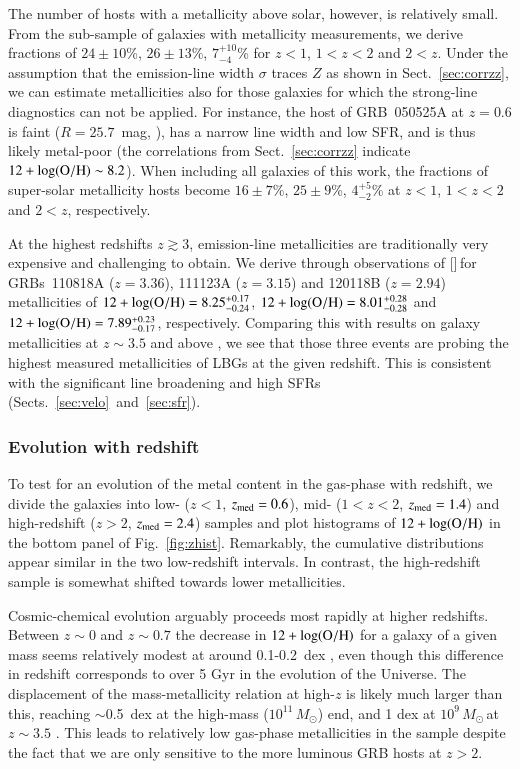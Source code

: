 \documentclass[traditabstract, longauth]{aa}
\newcommand{\oh}{12+\log(\rm{O/H})}
\newcommand{\neiii}{[\ion{Ne}{iii}]}
\newcommand{\Msun}{$M_\odot$}
\begin{document}
{The number of hosts with a metallicity above solar, however, is relatively small. From the sub-sample of galaxies with metallicity measurements, we derive fractions of $24\pm 10$\%, $26\pm 13$\%, $7_{-4}^{+10}$\% for $z<1$, $1<z<2$ and $2<z$.  
Under the assumption that the emission-line width $\sigma$ traces $Z$ as shown in Sect.~\ref{sec:corrzz}, we can estimate metallicities also for those galaxies for which the strong-line diagnostics can not be applied. For instance, the host of GRB~050525A at $z=0.6$ is faint ($R=25.7$~mag, \citealp{2012ApJ...756..187H}), has a narrow line width and low SFR, and is thus likely metal-poor (the correlations from Sect.~\ref{sec:corrzz} indicate $\oh\sim8.2$). When including all galaxies of this work, the fractions of super-solar metallicity hosts become $16\pm7$\%, $25\pm9$\%, $4_{-2}^{+5}$\% at $z<1$, $1<z<2$ and $2<z$, respectively.}

At the highest redshifts $z\gtrsim3$, emission-line metallicities are traditionally very expensive and challenging to obtain. We derive through observations of \neiii\,for GRBs~110818A ($z=3.36$), 111123A ($z=3.15$) and 120118B ($z=2.94$) metallicities of $\oh=8.25_{-0.24}^{+0.17}$, $\oh=8.01_{-0.28}^{+0.28}$ and $\oh=7.89_{-0.17}^{+0.23}$, respectively. Comparing this with results on galaxy metallicities at $z\sim3.5$ and above \citep{2008A&A...488..463M, 2011ApJ...739....1L}, we see that those three events are probing the highest measured metallicities of LBGs at the given redshift. This is consistent with the significant line broadening and high SFRs (Sects.~\ref{sec:velo}~and~\ref{sec:sfr}).


\subsubsection{Evolution with redshift}

To test for an evolution of the metal content in the gas-phase with redshift, we divide the galaxies into low- ($z<1$, $z_{\rm{med}}=0.6$), mid- ($1<z<2$, $z_{\rm{med}}=1.4$) and high-redshift ($z>2$, $z_{\rm{med}} = 2.4$) samples and plot histograms of $\oh$ in the bottom panel of Fig.~\ref{fig:zhist}. Remarkably, the cumulative distributions appear similar in the two low-redshift intervals. In contrast, the high-redshift sample is somewhat shifted towards lower metallicities.

Cosmic-chemical evolution arguably proceeds most rapidly at higher redshifts. Between $z\sim0$ and $z\sim0.7$ the decrease in $\oh$ for a galaxy of a given mass seems relatively modest at around 0.1-0.2~dex \citep{2004ApJ...613..898T, 2005ApJ...635..260S}, even though this difference in redshift corresponds to over 5 Gyr in the evolution of the Universe. The displacement of the mass-metallicity relation at high-$z$ is likely much larger than this, reaching $\sim$0.5~dex at the high-mass ($10^{11}$\,\Msun) end, and 1 dex at $10^{9}$\,\Msun\,at $z\sim3.5$ \citep{2008A&A...488..463M, 2014A&A...563A..58T}. This leads to relatively low gas-phase metallicities in the sample despite the fact that we are only sensitive to the more luminous GRB hosts at $z>2$.
\end{document}
